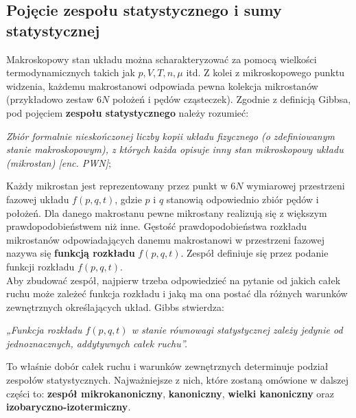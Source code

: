 \documentclass[12pt,a4paper,openright]{report} %
\begin{document}
\subsection{Pojęcie zespołu statystycznego i sumy statystycznej}
Makroskopowy stan układu można scharakteryzować za pomocą wielkości termodynamicznych takich jak $p, V, T, n, \mu$ itd. Z kolei z mikroskopowego punktu widzenia, każdemu makrostanowi odpowiada pewna kolekcja mikrostanów (przykładowo zestaw $6N$ położeń i pędów cząsteczek). Zgodnie z definicją Gibbsa, pod pojęciem \textbf{zespołu statystycznego} należy rozumieć:
\begin{center}
\textit{Zbiór formalnie nieskończonej liczby kopii układu fizycznego (o zdefiniowanym stanie makroskopowym), z których każda opisuje inny stan mikroskopowy układu (mikrostan) [enc. PWN]};
\end{center}
Każdy mikrostan jest reprezentowany przez punkt w $6N$ wymiarowej przestrzeni fazowej układu $f(p, q, t)$, gdzie $p$ i $q$ stanowią odpowiednio zbiór pędów i położeń. Dla danego makrostanu pewne mikrostany realizują się z większym prawdopodobieństwem niż inne. Gęstość prawdopodobieństwa rozkładu mikrostanów odpowiadających danemu makrostanowi w przestrzeni fazowej nazywa się \textbf{funkcją rozkładu} $f(p, q, t)$. Zespół definiuje się przez podanie funkcji rozkładu $f(p, q, t)$.\\
Aby zbudować zespół, najpierw trzeba odpowiedzieć na pytanie od jakich całek ruchu może zależeć funkcja rozkładu i jaką ma ona postać dla różnych warunków zewnętrznych określających układ. Gibbs stwierdza: 
\begin{center}
\textit{„Funkcja rozkładu $f(p, q, t)$ w stanie równowagi statystycznej zależy jedynie od jednoznacznych, addytywnych całek ruchu”.}
\end{center}
To właśnie dobór całek ruchu i warunków zewnętrznych determinuje podział zespołów statystycznych. Najważniejsze z nich, które zostaną omówione w dalszej części to: \textbf{zespół mikrokanoniczny}, \textbf{kanoniczny}, \textbf{wielki kanoniczny} oraz \textbf{izobaryczno-izotermiczny}.
\end{document}

